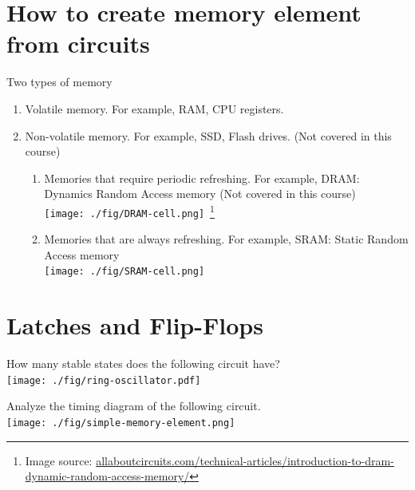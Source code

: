 \section{How to create memory element from circuits}

Two types of memory
\begin{enumerate}
  \item Volatile memory. For example, RAM, CPU registers.
  \item Non-volatile memory. For example, SSD, Flash drives. (Not covered in this course)
    \begin{enumerate}
    \item Memories that require periodic refreshing. For example, DRAM: Dynamics Random Access memory (Not covered in this course)\\
      \texttt{[image: ./fig/DRAM-cell.png]}~\footnote{Image
        source: \url{allaboutcircuits.com/technical-articles/introduction-to-dram-dynamic-random-access-memory/}}
    \item Memories that are always refreshing. For example, SRAM: Static Random
      Access memory~\cite[Appendix~B.64]{stephen2022fundamentals}\\
      \texttt{[image: ./fig/SRAM-cell.png]}
    \end{enumerate}
\end{enumerate}

\section{Latches and Flip-Flops \cite[Sec~3.2]{harris2022digital}}

\begin{example} \cite[Sec~3.31]{harris2022digital}
  How many stable states does the following circuit have?\\
  \texttt{[image: ./fig/ring-oscillator.pdf]} 
\end{example}
\vspace{10em}

\begin{definition}
\end{definition}
\vspace{5em}


\begin{example}
  Analyze the timing diagram of the following circuit.\\
  \texttt{[image: ./fig/simple-memory-element.png]}
\end{example}
\vspace{10em}

